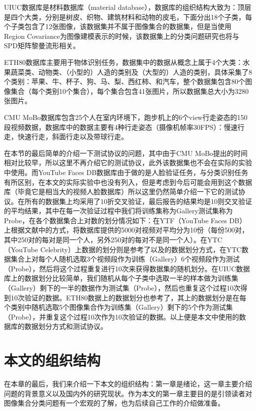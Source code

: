 UIUC数据库\cite{Database_UIUC}是材料数据库（material database），数据库的组织结构大致为：顶层是四个大类，分别是树皮、织物、建筑材料和动物的皮毛，下面分出18个子类，每个子类包含了12张图像，该数据集并不属于图像集合的数据集，但是当使用Region Covariance为图像建模表示的时候，该数据集上的分类问题研究也将与SPD矩阵黎曼流形相关。

ETH80数据库\cite{Database_ETH80}主要用于物体识别任务，数据集中的数据从概念上属于4个大类：水果蔬菜类、动物类、（小型的）人造的类别及（大型的）人造的类别，具体采集了8个类别：苹果、牛、杯子、狗、马、梨、西红柿、和汽车，整个数据集包含80个图像集合（每个类别10个集合），每个集合包含41张图片，所以数据集总大小为3280张图片。

CMU MoBo数据库\cite{Database_MoBo}包含25个人在室内环境下，跑步机上的6个view行走姿态的150段视频数据，数据库中的数据主要有4种行走姿态（摄像机帧率30FPS）：慢速行走，快速行走，斜面行走以及带球行走。

在本节的最后简单的介绍一下测试协议的问题，其中由于CMU MoBo\cite{Database_MoBo}提出的时间相对比较早，所以这里不再介绍它的测试协议，此外该数据集也不会在实际的实验中使用。而YouTube Faces DB数据库由于做的是人脸验证任务，与分类识别任务有所区别，在本文的实际实验中也没有列入，但是考虑到今后可能会用到这个数据库（毕竟它是相当大的视频人脸数据库）所以这里仍然简单介绍一下它的测试协议。在所有的数据集上均采用了10折交叉验证，最后报告的结果均是10则交叉验证的平均结果，其中在每一次验证过程中我们将训练集称为Gallery测试集称为Probe，在各个数据集合上对数的划分情况如下：在YTF（YouTube Faces DB）上根据文献\cite{Database_YTF}中的方式，将数据库提供的5000对视频对平均分为10份（每份500对，其中250对的每对是同一个人，另外250对的每对不是同一个人）。在YTC（YouTube Celebrity）\cite{Database_YTC}上数据的划分则是参考了\cite{Statistics_CDL}以及\cite{Statistics_Vemu}的数据划分方式，在YTC数据集合上对每个人随机选取3个视频段作为训练（Gallery）6个视频段作为测试（Probe），然后将这个过程重复进行10次来获得数据集的随机划分。在UIUC数据库\cite{Database_UIUC}上的数据划分比较简单，我们随机从每个子类中选取一半的样本做为训练集（Gallery）剩下的一半的数据作为测试集（Probe），然后也重复这个过程10次得到10次验证的数据。ETH80数据上的数据划分也参考了\cite{Statistics_CDL}，其上的数据划分是在每个类别中随机选取5个图像集合作为训练集（Gallery）剩下的5个作为测试集（Probe），并重复这个过程10次作为10次验证的数据。以上便是本文中使用的数据库的数据划分方式和测试协议。
\section{本文的组织结构}
\label{sec:struct}
在本章的最后，我们来介绍一下本文的组织结构：第一章是绪论，这一章主要介绍问题的背景意义以及国内外的研究现状。作为本文的第一章主要目的是引领读者对图像集合分类问题有一个宏观的了解，也为后续自己工作的介绍做准备。

